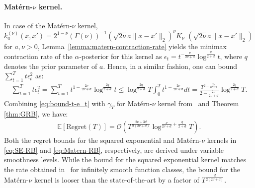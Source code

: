 \documentclass[final,12pt]{colt2026} %
\begin{document}
\paragraph{Mat\'{e}rn-$\nu$ kernel.} In case of the Mat\'{e}rn-$\nu$ kernel, $k^{(\nu)}_a(x, x') = 2^{1-\nu}(\Gamma(\nu))^{-1}(\sqrt{2\nu}a\lVert x-x'\rVert_2)^{\nu}K_{\nu}$ $(\sqrt{2\nu}a\lVert x-x'\rVert_2)$ for $a, \nu > 0$,
Lemma~\ref{lemma:matern-contraction-rate} yields the minimax contraction rate of the $\alpha$-posterior for this kernel as $\epsilon_t = t^{-\frac{\nu}{2\nu+d}} \log^{\frac{q}{2+d}} t$, where $q$ denotes the prior parameter of $a$. Hence, in a similar fashion, one can bound $\sum_{t=1}^{T}t\epsilon_t^2$ as:
\begin{align}\label{eq:bound-t-e_t}
    \sum_{t=1}^{T}t\epsilon_t^2 = \sum_{t=1}^{T} t^{1-\frac{2\nu}{2\nu+d}}\log^{\frac{2q}{2+d}} t \leq  \log^{\frac{2q}{2+d}
    } T\int_{0}^{T}t^{1-\frac{2\nu}{2\nu+d}}dt
        = \frac{T^{2-\frac{2\nu}{2\nu+d}}}{2-\frac{2\nu}{2\nu+d}}\log^{\frac{2q}{2+d}} T.
\end{align}
Combining \eqref{eq:bound-t-e_t} with $\gamma_T$ for Mat\'{e}rn-$\nu$ kernel from~\cite{vakili21a} and Theorem \ref{thm:GRB}, we have:
\begin{align}\label{eq:Matern-RB}
    \mathbb{E}[\mathrm{Regret}(T)] = \mathcal{O}\left(T^{\frac{2\nu+3d}{2(2\nu+d)}} \log^{\frac{\nu}{2\nu+d} + \frac{q}{2+d}} T\right).
\end{align}
Both the regret bounds for the squared exponential and Mat\'{e}rn-$\nu$ kernels in \eqref{eq:SE-RB} and \eqref{eq:Matern-RB}, respectively, are derived under variable smoothness levels. While the bound for the squared exponential kernel matches the rate obtained in~\cite{Ray&Gopalan2017} for infinitely smooth function classes, the bound for the Mat\'{e}rn-$\nu$ kernel is looser than the state-of-the-art by a factor of $T^{\frac{d}{2(2\nu+d)}}$.
\end{document}
